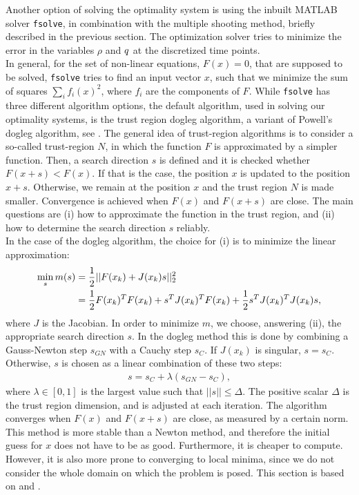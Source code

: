 Another option of solving the optimality system is using the inbuilt {\scshape MATLAB} solver \texttt{fsolve}, in combination with the multiple shooting method, briefly described in the previous section. The optimization solver tries to minimize the error in the variables $\rho$ and $q$ at the discretized time points. 
\\
In general, for the set of non-linear equations, $F(x) =0$, that are supposed to be solved, \texttt{fsolve} tries to find an input vector $x$, such that we minimize the sum of squares $\sum_i f_i(x)^2$, where $f_i$ are the components of $F$. 
While \texttt{fsolve} has three different algorithm options, the default algorithm, used in solving our optimality systems, is the trust region dogleg algorithm, a variant of Powell's dogleg algorithm, see \cite{Powell1}.   
The general idea of trust-region algorithms is to consider a so-called trust-region $N$, in which the function $F$ is approximated by a simpler function. Then, a search direction $s$ is defined and it is checked whether $F(x+s) < F(x)$. If that is the case, the position $x$ is updated to the position $x+s$. Otherwise, we remain at the position $x$ and the trust region $N$ is made smaller. Convergence is achieved when $F(x)$ and $F(x+s)$ are close.
The main questions are (i) how to approximate the function in the trust region, and (ii) how to determine the search direction $s$ reliably.\\
In the case of the dogleg algorithm, the choice for (i) is to minimize the linear approximation:
\begin{align}
\label{eqn:trustregionsubprob1}
\min_s m(s) &= \frac{1}{2}|| F(x_k) + J(x_k)s||_2^2 \\
&= \frac{1}{2}F(x_k)^T F(x_k) + s^T J(x_k)^T F(x_k) + \frac{1}{2}s^T J(x_k)^TJ(x_k)s, \notag
\end{align}
where $J$ is the Jacobian.
In order to minimize $m$, we choose, answering (ii), the appropriate search direction $s$. In the dogleg method this is done by combining a Gauss-Newton step $s_{GN}$ with a Cauchy step $s_C$.
If $J(x_k)$ is singular, $s = s_C$. Otherwise, $s$ is chosen as a linear combination of these two steps:
\begin{align*}
s = s_C + \lambda(s_{GN} - s_C),
\end{align*}
where $\lambda \in [0,1]$ is the largest value such that $||s|| \leq \Delta$. The positive scalar $\Delta$ is the trust region dimension, and is adjusted at each iteration. The algorithm converges when $F(x)$ and $F(x+s)$ are close, as measured by a certain norm. 
This method is more stable than a Newton method, and therefore the initial guess for $x$ does not have to be as good. Furthermore, it is cheaper to compute. However, it is also more prone to converging to local minima, since we do not consider the whole domain on which the problem is posed.
This section is based on \cite{Powell1} and \cite{fsolve1}.